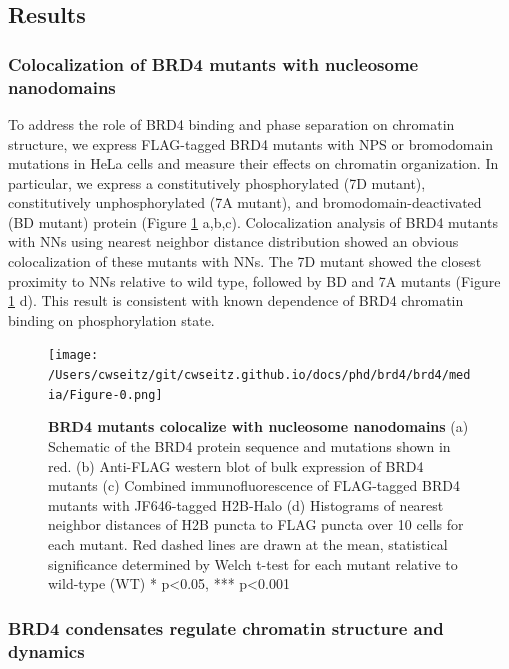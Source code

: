 \subsection{Results}

\subsubsection{Colocalization of BRD4 mutants with nucleosome nanodomains}

To address the role of BRD4 binding and phase separation on chromatin structure, we express FLAG-tagged BRD4 mutants with NPS or bromodomain mutations in HeLa cells and measure their effects on chromatin organization. In particular, we express a constitutively phosphorylated (7D mutant), constitutively unphosphorylated (7A mutant), and bromodomain-deactivated (BD mutant) protein (Figure \ref{fig:fig23} a,b,c). Colocalization analysis of BRD4 mutants with NNs using nearest neighbor distance distribution showed an obvious colocalization of these mutants with NNs. The 7D mutant showed the closest proximity to NNs relative to wild type, followed by BD and 7A mutants (Figure \ref{fig:fig23} d).  This result is consistent with known dependence of BRD4 chromatin binding on phosphorylation state. 

\begin{figure}[t]
\texttt{[image: /Users/cwseitz/git/cwseitz.github.io/docs/phd/brd4/brd4/media/Figure-0.png]}
\caption{\textbf{BRD4 mutants colocalize with nucleosome nanodomains} (a) Schematic of the BRD4 protein sequence and mutations shown in red. (b) Anti-FLAG western blot of bulk expression of BRD4 mutants (c) Combined immunofluorescence of FLAG-tagged BRD4 mutants with JF646-tagged H2B-Halo (d) Histograms of nearest neighbor distances of H2B puncta to FLAG puncta over 10 cells for each mutant. Red dashed lines are drawn at the mean, statistical significance determined by Welch t-test for each mutant relative to wild-type (WT) * p<0.05, *** p<0.001}
\label{fig:fig23}
\end{figure}
	
\subsubsection{BRD4 condensates regulate chromatin structure and dynamics}

